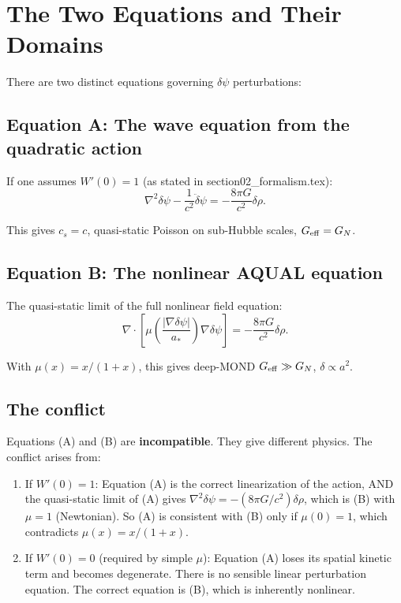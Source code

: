 \documentclass[11pt]{article}
\newcommand{\dpsi}{\delta\psi}
\newcommand{\Geff}{G_{\rm eff}}
\newcommand{\astar}{a_*}
\begin{document}
\section{The Two Equations and Their Domains}

There are two distinct equations governing $\dpsi$ perturbations:

\subsection{Equation A: The wave equation from the quadratic action}

If one assumes $W'(0) = 1$ (as stated in section02\_formalism.tex):
\begin{equation}
\nabla^2\dpsi - \frac{1}{c^2}\ddot\dpsi = -\frac{8\pi G}{c^2}\delta\rho.
\tag{A}
\label{eq:A}
\end{equation}

This gives $c_s = c$, quasi-static Poisson on sub-Hubble scales,
$\Geff = G_N$.

\subsection{Equation B: The nonlinear AQUAL equation}

The quasi-static limit of the full nonlinear field equation:
\begin{equation}
\nabla\cdot\left[\mu\!\left(\frac{|\nabla\dpsi|}{\astar}\right)
\nabla\dpsi\right] = -\frac{8\pi G}{c^2}\delta\rho.
\tag{B}
\label{eq:B}
\end{equation}

With $\mu(x) = x/(1+x)$, this gives deep-MOND $\Geff \gg G_N$,
$\delta \propto a^2$.

\subsection{The conflict}

Equations (A) and (B) are \textbf{incompatible}. They give different
physics. The conflict arises from:

\begin{enumerate}
\item If $W'(0) = 1$: Equation (A) is the correct linearization of
  the action, AND the quasi-static limit of (A) gives
  $\nabla^2\dpsi = -(8\pi G/c^2)\delta\rho$, which is (B) with
  $\mu = 1$ (Newtonian). So (A) is consistent with (B) only if
  $\mu(0) = 1$, which contradicts $\mu(x) = x/(1+x)$.

\item If $W'(0) = 0$ (required by simple $\mu$): Equation (A) loses
  its spatial kinetic term and becomes degenerate. There is no
  sensible linear perturbation equation. The correct equation is (B),
  which is inherently nonlinear.
\end{enumerate}
\end{document}
